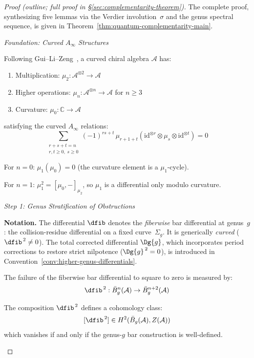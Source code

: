 \begin{proof}[Proof (outline; full proof in \S\textup{\ref{sec:complementarity-theorem}})]
The complete proof, synthesizing five lemmas via the Verdier
involution~$\sigma$ and the genus spectral sequence, is given in
Theorem~\ref{thm:quantum-complementarity-main}.

\emph{Foundation: Curved $A_\infty$ Structures}

Following Gui--Li--Zeng~\cite{GLZ22}, a curved chiral algebra $\mathcal{A}$ has:
\begin{enumerate}
\item Multiplication: $\mu_2: \mathcal{A}^{\otimes 2} \to \mathcal{A}$
\item Higher operations: $\mu_n: \mathcal{A}^{\otimes n} \to \mathcal{A}$ for $n \geq 3$
\item Curvature: $\mu_0: \mathbb{C} \to \mathcal{A}$
\end{enumerate}
satisfying the curved $A_\infty$ relations:
\[\sum_{\substack{r+s+t=n \\ r,t \geq 0,\; s \geq 0}} (-1)^{rs+t}\, \mu_{r+1+t}(\mathrm{id}^{\otimes r} \otimes \mu_s \otimes \mathrm{id}^{\otimes t}) = 0\]

For $n=0$: $\mu_1(\mu_0) = 0$ (the curvature element is a $\mu_1$-cycle).

For $n=1$: $\mu_1^2 = [\mu_0, -]_{\mu_2}$, so $\mu_1$ is a differential only modulo curvature.

\emph{Step 1: Genus Stratification of Obstructions}

\noindent
\textbf{Notation.}
The differential $\dfib$ denotes the \emph{fiberwise} bar differential at
genus~$g$: the collision-residue differential on a fixed curve~$\Sigma_g$.
It is generically \emph{curved} ($\dfib^{\,2} \neq 0$).
The total corrected differential $\Dg{g}$, which incorporates period
corrections to restore strict nilpotence ($\Dg{g}^{\,2} = 0$), is
introduced in Convention~\ref{conv:higher-genus-differentials}.

\medskip

The failure of the fiberwise bar differential to square to zero is measured by:
\[\dfib^{\,2}: \bar{B}^n_g(\mathcal{A}) \to \bar{B}^{n+2}_g(\mathcal{A})\]

\begin{lemma}\label{lem:obstruction-class}
The composition $\dfib^{\,2}$ defines a cohomology class:
\[[\dfib^{\,2}] \in H^2(\bar{B}_g(\mathcal{A}), Z(\mathcal{A}))\]
which vanishes if and only if the genus-$g$ bar construction is well-defined.
\end{lemma}


\end{proof}
